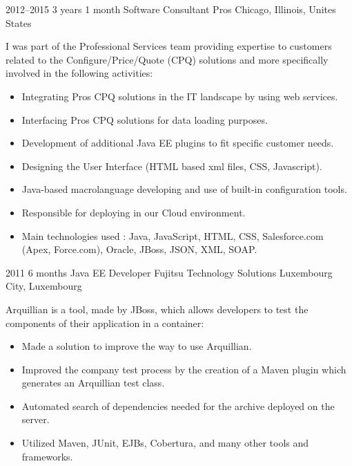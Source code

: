 \documentclass[]{friggeri-cv} %
\begin{document}

\begin{entrylist}

\entry
{2012--2015}
{3 years 1 month}
{Software Consultant} 
{Pros}
{Chicago, Illinois, Unites States}
{I was part of the Professional Services team providing expertise to customers related to the
Configure/Price/Quote (CPQ) solutions and more specifically involved in the following activities:\\

\vspace{-4mm}
\begin{itemize}
	\item Integrating Pros CPQ solutions in the IT landscape by using web services.
	\item Interfacing Pros CPQ solutions for data loading purposes.
	\item Development of additional Java EE plugins to fit specific customer needs.
    \item Designing the User Interface (HTML based xml files, CSS, Javascript).
    \item Java-based macrolanguage developing and use of built-in configuration tools.
    \item Responsible for deploying in our Cloud environment.
    \item Main technologies used : Java, JavaScript, HTML, CSS, Salesforce.com (Apex, Force.com), Oracle, JBoss, JSON, XML, SOAP.
\end{itemize}}
\vspace{-7mm}

\end{entrylist}


\begin{entrylist}

\entry
{2011}
{6 months}
{Java EE Developer} 
{Fujitsu Technology Solutions}
{Luxembourg City, Luxembourg}
{Arquillian is a tool, made by JBoss, which allows developers to test the components of their
application in a container:\\

\vspace{-4mm}
\begin{itemize}
	\item Made a solution to improve the way to use Arquillian.
	\item Improved the company test process by the creation of a Maven plugin which generates an Arquillian test class.
	\item Automated search of dependencies needed for the archive deployed on the server.
    \item Utilized Maven, JUnit, EJBs, Cobertura, and many other tools and frameworks.
\end{itemize}}
\vspace{-7mm}

\end{entrylist}
\end{document}
